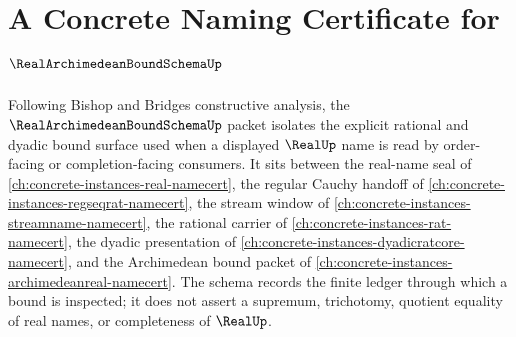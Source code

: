 \chapter{A Concrete Naming Certificate for $\RealArchimedeanBoundSchemaUp$}
\label{ch:concrete-instances-real-archimedean-bound-schema-namecert}

Following Bishop and Bridges constructive analysis, the $\RealArchimedeanBoundSchemaUp$ packet isolates the explicit rational and dyadic bound surface used when a displayed $\RealUp$ name is read by order-facing or completion-facing consumers. It sits between the real-name seal of \autoref{ch:concrete-instances-real-namecert}, the regular Cauchy handoff of \autoref{ch:concrete-instances-regseqrat-namecert}, the stream window of \autoref{ch:concrete-instances-streamname-namecert}, the rational carrier of \autoref{ch:concrete-instances-rat-namecert}, the dyadic presentation of \autoref{ch:concrete-instances-dyadicratcore-namecert}, and the Archimedean bound packet of \autoref{ch:concrete-instances-archimedeanreal-namecert}. The schema records the finite ledger through which a bound is inspected; it does not assert a supremum, trichotomy, quotient equality of real names, or completeness of $\RealUp$.

